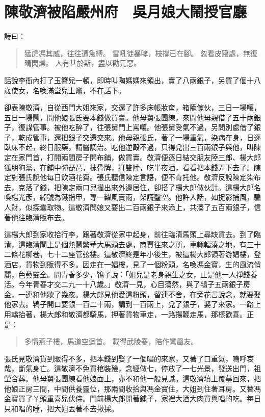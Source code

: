 
\chapter{陳敬濟被陷嚴州府　吳月娘大鬧授官廳}

詩曰：
\begin{quote}
猛虎馮其威，往往遭急縛。
雷吼徒暴哮，枝撐已在腳。
忽看皮寢處，無復晴閃爍。
人有甚於斯，盡以勸元惡。
\end{quote}

話說李衙內打了玉簪兒一頓，即時叫陶媽媽來領出，賣了八兩銀子，另買了個十八歲使女，名喚滿堂兒上竈，不在話下。

卻表陳敬濟，自從西門大姐來家，交還了許多床帳妝奩，箱籠傢伙，三日一場嚷，五日一場鬧，問他娘張氏要本錢做買賣。他母舅張團練，來問他母親借了五十兩銀子，復謀管事。被他吃醉了，往張舅門上罵嚷。他張舅受氣不過，另問別處借了銀子，乾成管事，還把銀子交還交來。他母親張氏，著了一場重氣，染病在身，日逐臥床不起，終日服藥，請醫調治。吃他逆毆不過，只得兌出三百兩銀子與他，叫陳定在家門首，打開兩間房子開布鋪，做買賣。敬濟便逐日結交朋友陸三郎、楊大郎狐朋狗黨，在鋪中彈琵琶，抹骨牌，打雙陸，吃半夜酒，看看把本錢弄下去了。陳定對張氏說他每日飲酒花費。張氏聽信陳定言語，便不肯托他。敬濟反說陳定染布去，克落了錢，把陳定兩口兒攆出來外邊居住，卻搭了楊大郎做伙計。這楊大郎名喚楊光彥，綽號為鐵指甲，專一糶風賣雨，架謊鑿空。他許人話，如捉影捕風，騙人財，似探囊取物。這敬濟問娘又要出二百兩銀子來添上，共湊了五百兩銀子，信著他往臨清販布去。

這楊大郎到家收拾行李，跟著敬濟從家中起身，前往臨清馬頭上尋缺貨去。到了臨清，這臨清閘上是個熱鬧繁華大馬頭去處，商賈往來之所，車輛輻湊之地，有三十二條花柳巷，七十二座管弦樓。這敬濟終是年小後生，被這楊大郎領著游娼樓，登酒店，貨物到販得不多。因走在一娼樓，見了一個粉頭，名喚馮金寶，生的風流俏麗，色藝雙全。問青春多少，鴇子說：「姐兒是老身親生之女，止是他一人掙錢養活。今年青春才交二九一十八歲。」敬濟一見，心目蕩然，與了鴇子五兩銀子房金，一連和他歇了幾夜。楊大郎見他愛這粉頭，留連不舍，在旁花言說念，就要娶他家去。鴇子開口要銀一百二十兩，講到一百兩上，兌了銀子，娶了來家。一路上用轎抬著，楊大郎和敬濟都騎馬，押著貨物車走，一路揚鞭走馬，那樣歡喜。正是：
\begin{quote}
多情燕子樓，馬道空迴首。
載得武陵春，陪作鸞凰友。
\end{quote}

張氏見敬濟貨到販得不多，把本錢到娶了一個唱的來家，又著了口重氣，嗚呼哀哉，斷氣身亡。這敬濟不免買棺裝殮，念經做七，停放了一七光景，發送出門，祖塋合葬。他母舅張團練看他娘面上，亦不和他一般見識。這敬濟墳上覆墓回來，把他娘正房三間，中間供養靈位，那兩間收拾與馮金寶住，大姐到住著耳房。又替馮金寶買了丫頭重喜兒伏侍。門前楊大郎開著鋪子，家裡大酒大肉買與唱的吃。每日只和唱的睡，把大姐丟著不去揪採。


